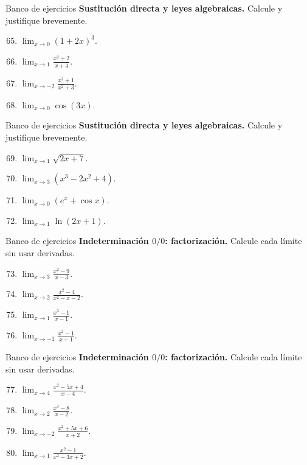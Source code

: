 \documentclass[12pt,aspectratio=169]{beamer}
\begin{document}
\begin{frame}[t,allowframebreaks]{Banco de ejercicios}
\small
\noindent \textbf{Sustitución directa y leyes algebraicas.} Calcule y justifique brevemente.\par\smallskip
\begin{enumerate}\setcounter{enumi}{64}
\item $\displaystyle\lim_{x\to0}(1+2x)^3$.
\item $\displaystyle\lim_{x\to1}\frac{x^2+2}{x+4}$.
\item $\displaystyle\lim_{x\to-2}\frac{x^2+1}{x^2+3}$.
\item $\displaystyle\lim_{x\to0}\cos(3x)$.
\end{enumerate}
\end{frame}


\begin{frame}[t,allowframebreaks]{Banco de ejercicios}
\small
\noindent \textbf{Sustitución directa y leyes algebraicas.} Calcule y justifique brevemente.\par\smallskip
\begin{enumerate}\setcounter{enumi}{68}
\item $\displaystyle\lim_{x\to1}\sqrt{2x+7}$.
\item $\displaystyle\lim_{x\to3}(x^3-2x^2+4)$.
\item $\displaystyle\lim_{x\to0}(e^x+\cos x)$.
\item $\displaystyle\lim_{x\to1}\ln(2x+1)$.
\end{enumerate}
\end{frame}


\begin{frame}[t,allowframebreaks]{Banco de ejercicios}
\small
\noindent \textbf{Indeterminación $0/0$: factorización.} Calcule cada límite sin usar derivadas.\par\smallskip
\begin{enumerate}\setcounter{enumi}{72}
\item $\displaystyle\lim_{x\to3}\frac{x^2-9}{x-3}$.
\item $\displaystyle\lim_{x\to2}\frac{x^2-4}{x^2-x-2}$.
\item $\displaystyle\lim_{x\to1}\frac{x^3-1}{x-1}$.
\item $\displaystyle\lim_{x\to-1}\frac{x^2-1}{x+1}$.
\end{enumerate}
\end{frame}


\begin{frame}[t,allowframebreaks]{Banco de ejercicios}
\small
\noindent \textbf{Indeterminación $0/0$: factorización.} Calcule cada límite sin usar derivadas.\par\smallskip
\begin{enumerate}\setcounter{enumi}{76}
\item $\displaystyle\lim_{x\to4}\frac{x^2-5x+4}{x-4}$.
\item $\displaystyle\lim_{x\to2}\frac{x^3-8}{x-2}$.
\item $\displaystyle\lim_{x\to-2}\frac{x^2+5x+6}{x+2}$.
\item $\displaystyle\lim_{x\to1}\frac{x^2-1}{x^2-3x+2}$.
\end{enumerate}
\end{frame}
\end{document}
